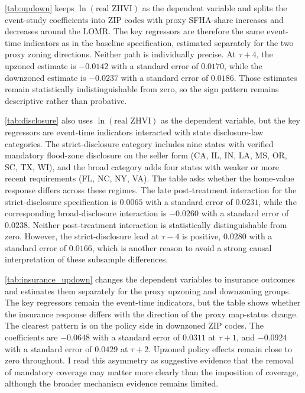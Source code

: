 \documentclass[12pt]{article}
\begin{document}


\autoref{tab:updown} keeps $\ln(\text{real ZHVI})$ as the dependent variable and splits the event-study coefficients into ZIP codes with proxy SFHA-share increases and decreases around the LOMR. The key regressors are therefore the same event-time indicators as in the baseline specification, estimated separately for the two proxy zoning directions. Neither path is individually precise. At $\tau{+}4$, the upzoned estimate is $-0.0142$ with a standard error of $0.0170$, while the downzoned estimate is $-0.0237$ with a standard error of $0.0186$. Those estimates remain statistically indistinguishable from zero, so the sign pattern remains descriptive rather than probative.



\autoref{tab:disclosure} also uses $\ln(\text{real ZHVI})$ as the dependent variable, but the key regressors are event-time indicators interacted with state disclosure-law categories. The strict-disclosure category includes nine states with verified mandatory flood-zone disclosure on the seller form (CA, IL, IN, LA, MS, OR, SC, TX, WI), and the broad category adds four states with weaker or more recent requirements (FL, NC, NY, VA). The table asks whether the home-value response differs across these regimes. The late post-treatment interaction for the strict-disclosure specification is $0.0065$ with a standard error of $0.0231$, while the corresponding broad-disclosure interaction is $-0.0260$ with a standard error of $0.0238$. Neither post-treatment interaction is statistically distinguishable from zero. However, the strict-disclosure lead at $\tau{-}4$ is positive, $0.0280$ with a standard error of $0.0166$, which is another reason to avoid a strong causal interpretation of these subsample differences.



\autoref{tab:insurance_updown} changes the dependent variables to insurance outcomes and estimates them separately for the proxy upzoning and downzoning groups. The key regressors remain the event-time indicators, but the table shows whether the insurance response differs with the direction of the proxy map-status change. The clearest pattern is on the policy side in downzoned ZIP codes. The coefficients are $-0.0648$ with a standard error of $0.0311$ at $\tau{+}1$, and $-0.0924$ with a standard error of $0.0429$ at $\tau{+}2$. Upzoned policy effects remain close to zero throughout. I read this asymmetry as suggestive evidence that the removal of mandatory coverage may matter more clearly than the imposition of coverage, although the broader mechanism evidence remains limited.
\end{document}
